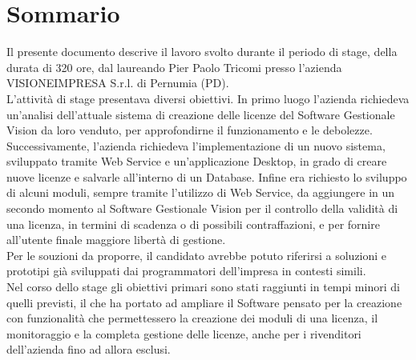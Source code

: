 
\cleardoublepage
{}
{}
\begingroup
\let\clearpage\relax
\let\cleardoublepage\relax
\let\cleardoublepage\relax

\chapter*{Sommario}

Il presente documento descrive il lavoro svolto durante il periodo di stage, della durata di 320 ore, dal laureando Pier Paolo Tricomi presso l'azienda VISIONEIMPRESA S.r.l. di Pernumia (PD).
\\
L'attività di stage presentava diversi obiettivi. In primo luogo l'azienda richiedeva un'analisi dell'attuale sistema di creazione delle licenze del Software Gestionale Vision da loro venduto, per approfondirne il funzionamento e le debolezze. Successivamente, l'azienda richiedeva l'implementazione di un nuovo sistema, sviluppato tramite Web Service e un'applicazione Desktop, in grado di creare nuove licenze e salvarle all'interno di un Database. Infine era richiesto lo sviluppo di alcuni moduli, sempre tramite l'utilizzo di Web Service, da aggiungere in un secondo momento al Software Gestionale Vision per il controllo della validità di una licenza, in termini di scadenza o di possibili contraffazioni, e per fornire all'utente finale maggiore libertà di gestione.\\
Per le souzioni da proporre, il candidato avrebbe potuto riferirsi a soluzioni e prototipi già sviluppati dai programmatori dell'impresa in contesti simili.
\\Nel corso dello stage gli obiettivi primari sono stati raggiunti in tempi minori di quelli previsti, il che ha portato ad ampliare il Software pensato per la creazione con funzionalità che permettessero la creazione dei moduli di una licenza, il monitoraggio e la completa gestione delle licenze, anche per i rivenditori dell'azienda fino ad allora esclusi.
%
%

\endgroup			

\vfill

